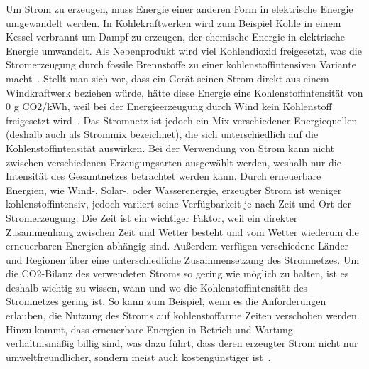 Um Strom zu erzeugen, muss Energie einer anderen Form in elektrische Energie umgewandelt werden.
In Kohlekraftwerken wird zum Beispiel Kohle in einem Kessel verbrannt um Dampf zu erzeugen, der chemische Energie in elektrische Energie umwandelt.
Als Nebenprodukt wird viel Kohlendioxid freigesetzt, was die Stromerzeugung durch fossile Brennstoffe zu einer kohlenstoffintensiven Variante macht~\cite{Currie.2024}.
Stellt man sich vor, dass ein Gerät seinen Strom direkt aus einem Windkraftwerk beziehen würde, hätte diese Energie eine Kohlenstoffintensität von 0 g CO2/kWh, weil bei der Energieerzeugung durch Wind kein Kohlenstoff freigesetzt wird~\cite{GreenSoftwareFoundation.2022}.
Das Stromnetz ist jedoch ein Mix verschiedener Energiequellen (deshalb auch als Strommix bezeichnet), die sich unterschiedlich auf die Kohlenstoffintensität auswirken.
Bei der Verwendung von Strom kann nicht zwischen verschiedenen Erzeugungsarten ausgewählt werden, weshalb nur die Intensität des Gesamtnetzes betrachtet werden kann.
Durch erneuerbare Energien, wie Wind-, Solar-, oder Wasserenergie, erzeugter Strom ist weniger kohlenstoffintensiv, jedoch variiert seine Verfügbarkeit je nach Zeit und Ort der Stromerzeugung.
Die Zeit ist ein wichtiger Faktor, weil ein direkter Zusammenhang zwischen Zeit und Wetter besteht und vom Wetter wiederum die erneuerbaren Energien abhängig sind.
Außerdem verfügen verschiedene Länder und Regionen über eine unterschiedliche Zusammensetzung des Stromnetzes.
Um die CO2-Bilanz des verwendeten Stroms so gering wie möglich zu halten, ist es deshalb wichtig zu wissen, wann und wo die Kohlenstoffintensität des Stromnetzes gering ist.
So kann zum Beispiel, wenn es die Anforderungen erlauben, die Nutzung des Stroms auf kohlenstoffarme Zeiten verschoben werden.
Hinzu kommt, dass erneuerbare Energien in Betrieb und Wartung verhältnismäßig billig sind, was dazu führt, dass deren erzeugter Strom nicht nur umweltfreundlicher, sondern meist auch kostengünstiger ist~\cite{NationalGrid.20231106T13:28:05.000Z}.

